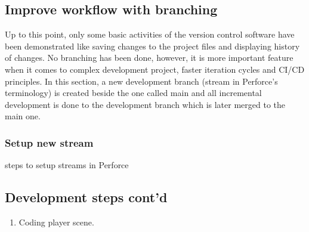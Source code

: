 \subsection{Improve workflow with branching}
Up to this point, only some basic activities of the version control software have been
demonstrated like saving changes to the project files and displaying history of changes. No branching
has been done, however, it is more important feature when it comes to complex development project, faster iteration cycles and
CI/CD principles. In this section, a new development branch (stream in Perforce's terminology) is created beside the one
called main and all incremental development is done to the development branch which is later merged to the main one.
\subsubsection{Setup new stream}
steps to setup streams in Perforce

\subsection{Development steps cont'd}
\begin{enumerate}[resume]
    \item Coding player scene.
\end{enumerate}